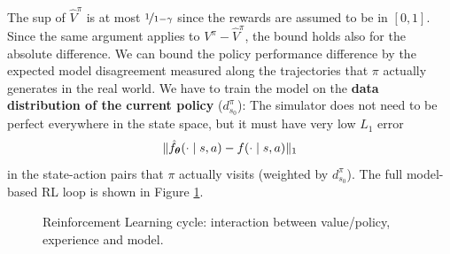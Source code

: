 \documentclass[10pt, a4paper]{report}
\begin{document}
\noindent The sup of $\hat V^\pi$ is at most $\nicefrac{1}{1-\gamma}$ since the rewards are assumed to be in $[0,1]$. Since the same argument applies to $V^\pi-\hat V^\pi$, the bound holds also for the absolute difference. We can bound the policy performance difference by the expected model disagreement measured along the
trajectories that $\pi$ actually generates in the real world. We have to train the model on the \textbf{data distribution of the current policy} ($d_{s_0}^\pi$): The simulator does not need to be perfect everywhere in the state space, but it must have very low $L_1$ error $$\|
\hat f_{\boldsymbol{\theta}} (\cdot\mid s,a)-f (\cdot\mid s,a)
\|_1$$
in the state-action pairs that $\pi$ actually visits (weighted by $d_{s_0}^\pi$).
The full model-based RL loop is shown in Figure \ref{RL_loop}.
\begin{figure}[H]
  \centering
  \caption{Reinforcement Learning cycle: interaction between value/policy, experience and model.}
  \label{RL_loop}
\end{figure}
\end{document}

